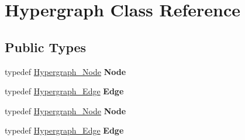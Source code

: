 \hypertarget{classHypergraph}{
\section{Hypergraph Class Reference}
\label{classHypergraph}
}
\subsection*{Public Types}
\begin{DoxyCompactItemize}
\item 
\hypertarget{classHypergraph_a36c26b747a86e20cc9e7b0ce733fe38a}{
typedef \hyperlink{classHypergraph__Node}{Hypergraph\_\-Node} {\bfseries Node}}
\label{classHypergraph_a36c26b747a86e20cc9e7b0ce733fe38a}

\item 
\hypertarget{classHypergraph_a8161caf487c105fff5e3ffd589ed176f}{
typedef \hyperlink{classHypergraph__Edge}{Hypergraph\_\-Edge} {\bfseries Edge}}
\label{classHypergraph_a8161caf487c105fff5e3ffd589ed176f}

\item 
\hypertarget{classHypergraph_a36c26b747a86e20cc9e7b0ce733fe38a}{
typedef \hyperlink{classHypergraph__Node}{Hypergraph\_\-Node} {\bfseries Node}}
\label{classHypergraph_a36c26b747a86e20cc9e7b0ce733fe38a}

\item 
\hypertarget{classHypergraph_a8161caf487c105fff5e3ffd589ed176f}{
typedef \hyperlink{classHypergraph__Edge}{Hypergraph\_\-Edge} {\bfseries Edge}}
\label{classHypergraph_a8161caf487c105fff5e3ffd589ed176f}

\end{DoxyCompactItemize}
